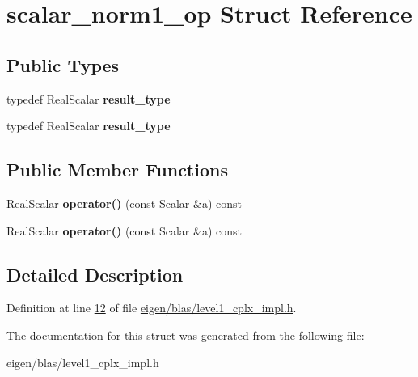 \hypertarget{structscalar__norm1__op}{}\section{scalar\+\_\+norm1\+\_\+op Struct Reference}
\label{structscalar__norm1__op}
\subsection*{Public Types}
\begin{DoxyCompactItemize}
\item 
\mbox{\label{structscalar__norm1__op_a69f3fe4cb34ed80ca061725ef075b904}} 
typedef Real\+Scalar {\bfseries result\+\_\+type}
\item 
\mbox{\label{structscalar__norm1__op_a69f3fe4cb34ed80ca061725ef075b904}} 
typedef Real\+Scalar {\bfseries result\+\_\+type}
\end{DoxyCompactItemize}
\subsection*{Public Member Functions}
\begin{DoxyCompactItemize}
\item 
\mbox{\label{structscalar__norm1__op_ac0fcc76dd10e4d2ede8c9a949bc6d850}} 
Real\+Scalar {\bfseries operator()} (const Scalar \&a) const
\item 
\mbox{\label{structscalar__norm1__op_ac0fcc76dd10e4d2ede8c9a949bc6d850}} 
Real\+Scalar {\bfseries operator()} (const Scalar \&a) const
\end{DoxyCompactItemize}


\subsection{Detailed Description}


Definition at line \hyperlink{eigen_2blas_2level1__cplx__impl_8h_source_l00012}{12} of file \hyperlink{eigen_2blas_2level1__cplx__impl_8h_source}{eigen/blas/level1\+\_\+cplx\+\_\+impl.\+h}.



The documentation for this struct was generated from the following file\+:\begin{DoxyCompactItemize}
\item 
eigen/blas/level1\+\_\+cplx\+\_\+impl.\+h\end{DoxyCompactItemize}
